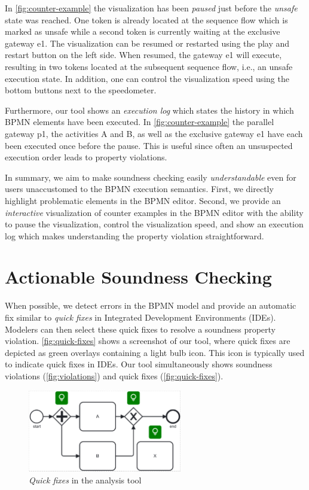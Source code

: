 \documentclass[runningheads]{llncs}
\begin{document}
In \autoref{fig:counter-example} the visualization has been \textit{paused} just before the \textit{unsafe} state was reached.
One token is already located at the sequence flow which is marked as unsafe while a second token is currently waiting at the exclusive gateway \textsf{e1}.
The visualization can be resumed or restarted using the play and restart button on the left side.
When resumed, the gateway \textsf{e1} will execute, resulting in two tokens located at the subsequent sequence flow, i.e., an unsafe execution state.
In addition, one can control the visualization speed using the bottom buttons next to the speedometer.

Furthermore, our tool shows an \textit{execution log} which states the history in which BPMN elements have been executed.
In \autoref{fig:counter-example} the parallel gateway \textsf{p1}, the activities \textsf{A} and \textsf{B}, as well as the exclusive gateway \textsf{e1} have each been executed once before the pause.
This is useful since often an unsuspected execution order leads to property violations.

In summary, we aim to make soundness checking easily \textit{understandable} even for users unaccustomed to the BPMN execution semantics.
First, we directly highlight problematic elements in the BPMN editor.
Second, we provide an \textit{interactive} visualization of counter examples in the BPMN editor with the ability to pause the visualization, control the visualization speed, and show an execution log which makes understanding the property violation straightforward.

\section{Actionable Soundness Checking}

When possible, we detect errors in the BPMN model and provide an automatic fix similar to \textit{quick fixes} in Integrated Development Environments (IDEs).
Modelers can then select these quick fixes to resolve a soundness property violation.
\autoref{fig:quick-fixes} shows a screenshot of our tool, where quick fixes are depicted as green overlays containing a light bulb icon.
This icon is typically used to indicate quick fixes in IDEs.
Our tool simultaneously shows soundness violations (\autoref{fig:violations}) and quick fixes (\autoref{fig:quick-fixes}).

\begin{figure}[ht]
	\centering
	\includegraphics[width=0.6\textwidth]{images/quickfixes}
	\caption{\textit{Quick fixes} in the analysis tool}
	\label{fig:quick-fixes}
\end{figure}
\end{document}
